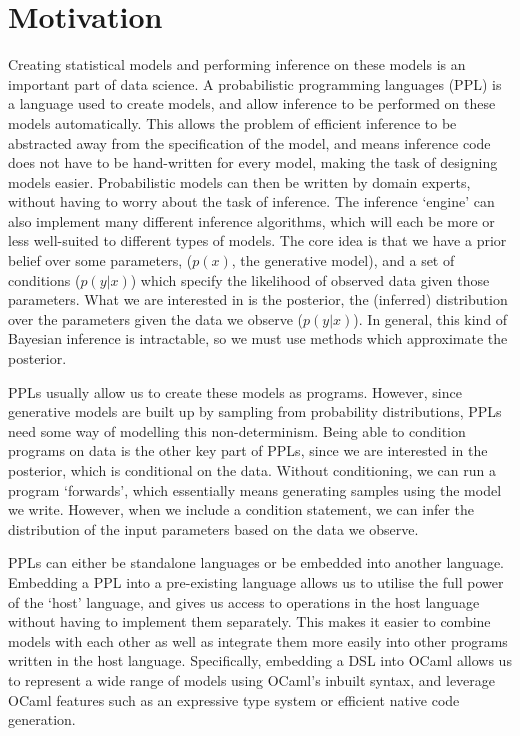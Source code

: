 \section{Motivation}

Creating statistical models and performing inference on these models is an important part of data science. A probabilistic programming languages (PPL) is a language used to create models, and allow inference to be performed on these models automatically. This allows the problem of efficient inference to be abstracted away from the specification of the model, and means inference code does not have to be hand-written for every model, making the task of designing models easier. Probabilistic models can then be written by domain experts, without having to worry about the task of inference. The inference `engine' can also implement many different inference algorithms, which will each be more or less well-suited to different types of models. The core idea is that we have a prior belief over some parameters, ($p(x)$, the generative model), and a set of conditions ($p(y|x)$) which specify the likelihood of observed data given those parameters. What we are interested in is the posterior, the (inferred) distribution over the parameters given the data we observe ($p(y|x)$). In general, this kind of Bayesian inference is intractable, so we must use methods which approximate the posterior.

PPLs usually allow us to create these models as programs. However, since generative models are built up by sampling from probability distributions, PPLs need some way of modelling this non-determinism. Being able to condition programs on data is the other key part of PPLs, since we are interested in the posterior, which is conditional on the data. Without conditioning, we can run a program `forwards', which essentially means generating samples using the model we write. However, when we include a condition statement, we can infer the distribution of the input parameters based on the data we observe.

PPLs can either be standalone languages or be embedded into another language. Embedding a PPL into a pre-existing language allows us to utilise the full power of the `host' language, and gives us access to operations in the host language without having to implement them separately. This makes it easier to combine models with each other as well as integrate them more easily into other programs written in the host language. Specifically, embedding a DSL into OCaml allows us to represent a wide range of models using OCaml's inbuilt syntax, and leverage OCaml features such as an expressive type system or efficient native code generation.

